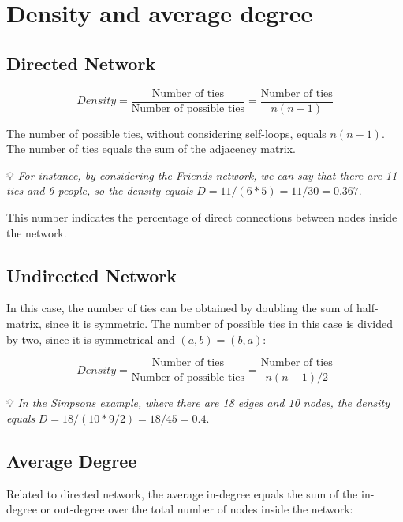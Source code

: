 \documentclass[
  notitlepage,
  onecolumn,
  openany]{book}
\begin{document}
\hypertarget{density-and-average-degree}{%
\section{Density and average degree}\label{density-and-average-degree}}

\hypertarget{directed-network-1}{%
\subsection{Directed Network}\label{directed-network-1}}

\[
Density = \frac{\text{Number of ties}}{\text{Number of possible ties}} =\frac{\text{Number of ties}}{n(n-1)} 
\]

The number of possible ties, without considering self-loops, equals \(n(n-1)\). The number of ties equals the sum of the adjacency matrix.

💡 \emph{For instance, by considering the Friends network, we can say that there are 11 ties and 6 people, so the density equals} \(D = 11/(6*5) = 11/30 = 0.367\).

This number indicates the percentage of direct connections between nodes inside the network.

\hypertarget{undirected-network-1}{%
\subsection{Undirected Network}\label{undirected-network-1}}

In this case, the number of ties can be obtained by doubling the sum of half-matrix, since it is symmetric. The number of possible ties in this case is divided by two, since it is symmetrical and \((a,b) = (b,a)\):

\[
Density = \frac{\text{Number of ties}}{\text{Number of possible ties}} =\frac{\text{Number of ties}}{n(n-1)/2} 
\]

💡 \emph{In the Simpsons example, where there are 18 edges and 10 nodes, the density equals} \(D = 18/(10*9/2) = 18/45 = 0.4\).

\hypertarget{average-degree}{%
\subsection{Average Degree}\label{average-degree}}

Related to directed network, the average in-degree equals the sum of the in-degree or out-degree over the total number of nodes inside the network:
\end{document}
